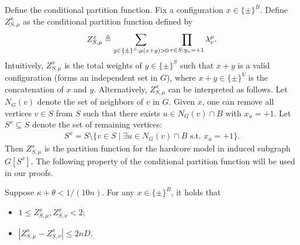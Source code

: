 Define the conditional partition function.
Fix a configuration $x \in \{\pm\}^B$. Define $Z_{S,\mu}^x$ as the conditional partition function defined by
\begin{align*}
    Z_{S,\mu}^x \triangleq \sum_{y \in \{\pm\}^S: \mu(x+y) > 0} \prod_{v \in S: y_v = + 1}\lambda_v^\mu.
\end{align*}
Intuitively, $Z_{S,\mu}^x$ is the total weights of $y \in \{\pm\}^S$ such that $x+y$ is a valid configuration (forms an independent set in $G$), where $x+y \in \{\pm\}^V$ is the concatenation of $x$ and $y$.
Alternatively, $Z_{S,\mu}^x$ can be interpreted as follows. Let $N_G(v)$ denote the set of neighbors of $v$ in $G$. Given $x$, one can remove all vertices $v \in S$ from $S$ such that there exists $u \in N_G(v) \cap B$ with $x_u =+1$. Let $S^x \subseteq S$ denote the set of remaining vertices:
\begin{align}\label{eq:sx}
   S^x = S \setminus \{v \in S \mid \exists u \in N_G(v)\cap B \text{ s.t. } x_u = +1 \}. 
\end{align}
Then $Z_{S,\mu}^x$ is the partition function for the hardcore model in induced subgraph $G[S^x]$. 
The following property of the conditional partition function will be used in our proofs.
\begin{lemma}\label{lem:Zcond-bound}
Suppose $\kappa + \theta < 1/(10n)$.
For any $x \in \{\pm\}^B$, it holds that 
\begin{itemize}
    \item $1 \leq Z_{S,\mu}^x,Z_{S,\nu}^x < 2 $;
    \item $|Z_{S,\mu}^x - Z_{S,\nu}^x| \leq 2 n D$.
\end{itemize}
\end{lemma}
